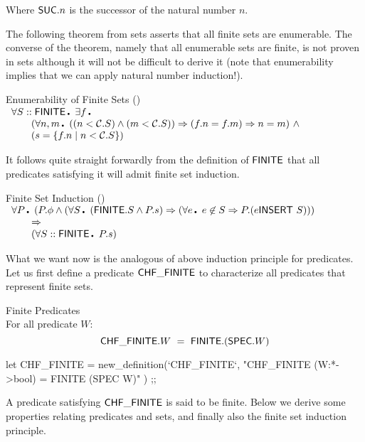 Where ${\sf SUC}.n$ is the successor of the natural number $n$.

The following theorem from \code{}sets\edoc{} asserts that all finite sets are
enumerable. The converse of the theorem, namely that all enumerable
sets are finite, is not proven in \code{}sets\edoc{} although it will not be
difficult to derive it (note that enumerability implies that we can
apply natural number induction!).

\begin{theorem}{Enumerability of Finite Sets ()}
\Eline
$\begin{array}{l}
  \qA S::\Fin\Dot \qE f\Dot \\
  \TAB (\qA n,m\Dot  ((n < \CARD.S) \AND (m < \CARD.S)) 
                     \IMP (f.n = f.m) \IMP n = m) \ \AND \\
  \TAB (s = \Set{f.n \mid  n< \CARD.S})
\end{array}$
\end{theorem}

It follows quite straight forwardly from the definition of ${\sf FINITE}$
that all predicates satisfying it will admit finite set induction.

\begin{theorem}{Finite Set Induction ()}
\Eline
$\begin{array}{l}
  \qA P\Dot (P.\Empty \AND
      (\qA S\Dot (\Fin.S \AND P.s) \IMP 
           (\qA e\Dot e\not\in S \IMP P.(e \INSERT S))) \\
      \TAB \IMP \\
      \TAB (\qA S::\Fin\Dot P.s)
\end{array}$
\end{theorem}

What we want now is the analogous of above induction principle for
predicates. Let us first define a predicate ${\sf CHF\_FINITE}$ to characterize
all predicates that represent finite sets.

\begin{definition}{Finite Predicates}\\
For all predicate $W$:
\[ {\sf CHF\_FINITE}.W\ = \ {\sf FINITE}.({\sf SPEC}.W) \]
\end{definition}

\enddocs
{}
\endmoddef
let CHF_FINITE = new_definition(`CHF_FINITE`, 
   "CHF_FINITE (W:*->bool) = FINITE (SPEC W)" ) ;;
\endcode
{}


A predicate satisfying ${\sf CHF\_FINITE}$ is said to be finite. Below we derive
some properties relating predicates and sets, and finally also the
finite set induction principle.

